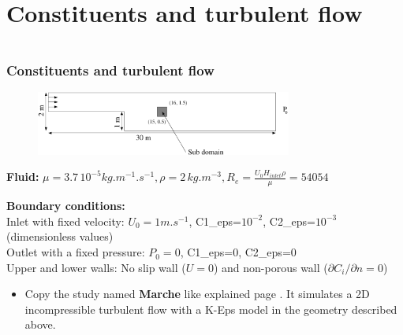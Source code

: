 \documentclass[10pt]{beamer}
\begin{document}


\section{Constituents and turbulent flow}
\begin{frame}
\begin{columns}[c] 
\tableofcontents[sections={1-7},currentsection, currentsubsection]
\tableofcontents[sections={8-13},currentsection, currentsubsection]
\end{columns}
\end{frame}
\begin{frame}
\frametitle{Constituents and turbulent flow}
\begin{block}{}

\begin{figure}
\includegraphics[width=0.75\textwidth]{PICTURES/marche.pdf}
\end{figure}

\textbf{Fluid:} $\mu=3.7 \, 10^{-5} kg.m^{-1}.s^{-1}, \rho=2 \, kg.m^{-3}, R_e=\frac{U_0 H_{inlet} \rho}{\mu} =54054$

\textbf{Boundary conditions:} \\
Inlet with fixed velocity: $U_0=1 m.s^{-1}$, C1\_eps=$10^{-2}$, C2\_eps=$10^{-3}$ (dimensionless values)\\
Outlet with a fixed pressure: $P_0=0$, C1\_eps=0, C2\_eps=0 \\
Upper and lower walls: No slip wall ($U=0$) and non-porous wall ($\partial C_i/\partial n=0$)

\begin{itemize}
\item Copy the study named \textbf{Marche} like explained page \pageref{method_copy}. It simulates a 2D incompressible turbulent flow with a K-Eps model in the geometry described above.
\end{itemize}

\end{block}
\end{frame}
\end{document}
